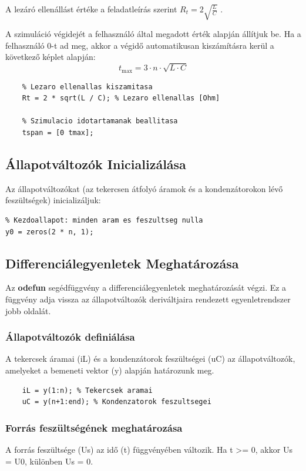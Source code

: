 \documentclass[12pt,a4paper]{article}
\begin{document}
A lezáró ellenállást értéke a feladatleírás szerint 
\( R_t = 2 \sqrt{\frac{L}{C}} \)
.

A szimuláció végidejét a felhasználó által megadott érték alapján állítjuk be. Ha a felhasználó 0-t ad meg, akkor a végidő automatikusan kiszámításra kerül a következő képlet alapján:
\[ t_{\text{max}} = 3 \cdot n \cdot \sqrt{L \cdot C} \]

\begin{lstlisting}
    % Lezaro ellenallas kiszamitasa
    Rt = 2 * sqrt(L / C); % Lezaro ellenallas [Ohm]

    % Szimulacio idotartamanak beallitasa
    tspan = [0 tmax];
\end{lstlisting}

\subsection*{Állapotváltozók Inicializálása}

Az állapotváltozókat (az tekercsen átfolyó áramok és a kondenzátorokon lévő feszültségek) inicializáljuk:

\begin{lstlisting}
% Kezdoallapot: minden aram es feszultseg nulla
y0 = zeros(2 * n, 1);
\end{lstlisting}

\subsection*{Differenciálegyenletek Meghatározása}

Az \textbf{odefun} segédfüggvény a differenciálegyenletek meghatározását végzi. Ez a függvény adja vissza az állapotváltozók deriváltjaira rendezett egyenletrendszer jobb oldalát.

\subsubsection{Állapotváltozók definiálása}

A tekercsek áramai (iL) és a kondenzátorok feszültségei (uC) az állapotváltozók, amelyeket a bemeneti vektor (y) alapján határozunk meg.

\begin{lstlisting}
    iL = y(1:n); % Tekercsek aramai
    uC = y(n+1:end); % Kondenzatorok feszultsegei
\end{lstlisting}

\subsubsection{Forrás feszültségének meghatározása}
A forrás feszültsége (Us) az idő (t) függvényében változik. Ha t >= 0, akkor Us = U0, különben Us = 0.
\end{document}
